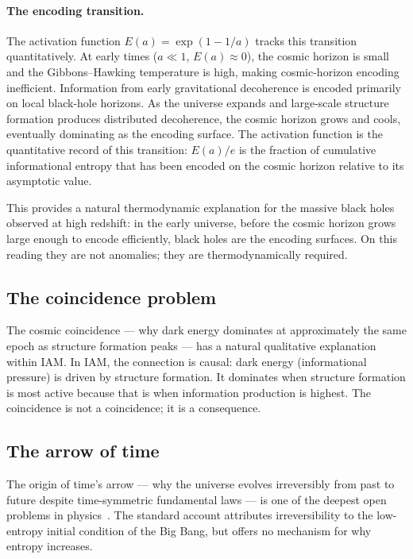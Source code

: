 \paragraph{The encoding transition.} The activation function $E(a)=\exp(1-1/a)$ tracks this transition quantitatively. At early times ($a\ll1$,
$E(a)\approx0$), the cosmic horizon is small and the Gibbons--Hawking temperature is high, making cosmic-horizon encoding inefficient. Information from
early gravitational decoherence is encoded primarily on local black-hole horizons. As the universe expands and large-scale structure formation produces
distributed decoherence, the cosmic horizon grows and cools, eventually dominating as the encoding surface. The activation function is the quantitative
record of this transition: $E(a)/e$ is the fraction of cumulative informational entropy that has been encoded on the cosmic horizon relative to its
asymptotic value.

This provides a natural thermodynamic explanation for the massive black holes observed at high redshift: in the early universe, before
the cosmic horizon grows large enough to encode efficiently, black holes are the encoding surfaces. On this reading they are not anomalies; they are
thermodynamically required. \interp

\subsection{The coincidence problem}
The cosmic coincidence --- why dark energy dominates at approximately the same epoch as structure formation peaks --- has a natural qualitative
explanation within IAM. In IAM, the connection is causal: dark energy (informational pressure) is driven by structure formation. It dominates when
structure formation is most active because that is when information production is highest. The coincidence is not a coincidence; it is a consequence.
\conjecture

\subsection{The arrow of time}
The origin of time's arrow --- why the universe evolves irreversibly from past to future despite time-symmetric fundamental laws --- is one of the deepest
open problems in physics~\cite{Penrose1989,CarrollChen2004}. The standard account attributes irreversibility to the low-entropy initial condition of the Big Bang, but offers
no mechanism for why entropy increases. \openprob

